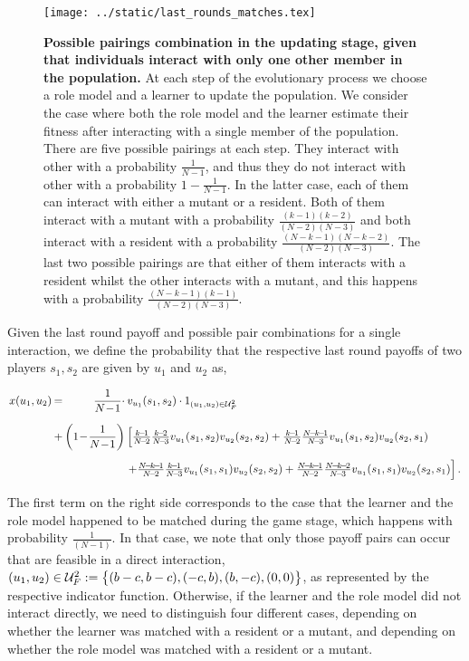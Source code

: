 \documentclass[11pt]{article}
\newcommand{\splitatcommas}[1]{%
  \begingroup
  \begingroup\lccode`~=`, \lowercase{\endgroup \edef~{\mathchar\the\mathcode`,
    \penalty0 \noexpand\hspace{0pt plus 1em}}%
  }\mathcode`,="8000 #1%
  \endgroup
}
\theoremstyle{plainCl1}
\theoremstyle{plainCl2}
\begin{document}
\begin{figure}[!htbp]
  \centering
  \texttt{[image: ../static/last\_rounds\_matches.tex]}
  \caption{\textbf{Possible pairings combination in the updating stage, given
  that individuals interact with only one other member in the population.} At
  each step of the evolutionary process we choose a role model and a learner to
  update the population. We consider the case where both the role model and the
  learner estimate their fitness after interacting with a single member of the
  population. There are five possible pairings at each step. They interact with
  other with a probability \(\frac{1}{N - 1}\), and thus they do not interact
  with other with a probability \(1 - \frac{1}{N - 1}\). In the latter case,
  each of them can interact with either a mutant or a resident. Both of them
  interact with a mutant with a probability $\frac{(k-1)(k-2)}{(N-2)(N-3)}$ and
  both interact with a resident with a probability
  $\frac{(N-k-1)(N-k-2)}{(N-2)(N-3)}$. The last two possible pairings are that
  either of them interacts with a resident whilst the other interacts with a
  mutant, and this happens with a probability
  $\frac{(N-k-1)(k-1)}{(N-2)(N-3)}$.}
  \label{fig:single_pairs}
\end{figure}

Given the last round payoff and possible pair combinations for a single
interaction, we define the probability that the respective last round payoffs of
two players \(s_1, s_2\) are given by $u_1$ and $u_2$ as,

\begin{equation}\label{eq:Chi}
\setlength{\arraycolsep}{1pt}
\begin{array}{llrl}
x(u_1,u_2)	 &=&\displaystyle \frac{1}{N\!-\!1}\cdot  &v_{u_1}(s_1,s_2)\cdot 1_{(u_1,u_2)\in \mathcal{U}^2_F}\\[0.5cm]
&+	
&\displaystyle \left(1\!-\!\frac{1}{N\!-\!1}\right)  
&\left[ \frac{k\!-\!1}{N\!-\!2}\frac{k\!-\!2}{N\!-\!3} v_{u_1}(s_1,s_2) v_{u_2}(s_2,s_2) + 
 \frac{k\!-\!1}{N\!-\!2}\frac{N\!-\!k\!-\!1}{N\!-\!3} v_{u_1}(s_1,s_2) v_{u_2}(s_2,s_1)\right.\\[0.5cm]
&&&\left. +\frac{N\!-\!k\!-\!1}{N\!-\!2}\frac{k\!-\!1}{N\!-\!3} v_{u_1}(s_1,s_1) v_{u_2}(s_2,s_2) + 
 \frac{N\!-\!k\!-\!1}{N\!-\!2}\frac{N\!-\!k\!-\!2}{N\!-\!3} v_{u_1}(s_1,s_1) v_{u_2}(s_2,s_1)\right].
\end{array}
\end{equation}

The first term on the right side corresponds to the case that the learner and
the role model happened to be matched during the game stage, which happens with
probability $\frac{1}{(N\!-\!1)}$. In that case, we note that only those payoff
pairs can occur that are feasible in a direct interaction,
$\splitatcommas{(u_1,u_2)\in \mathcal{U}^2_F:=\big\{ (b-c, b-c), (-c, b), (b, -c), (0, 0)
\big\}}$, as represented by the respective indicator function. Otherwise, if the
learner and the role model did not interact directly, we need to distinguish
four different cases, depending on whether the learner was matched with a
resident or a mutant, and depending on whether the role model was matched with a
resident or a mutant.
\end{document}

